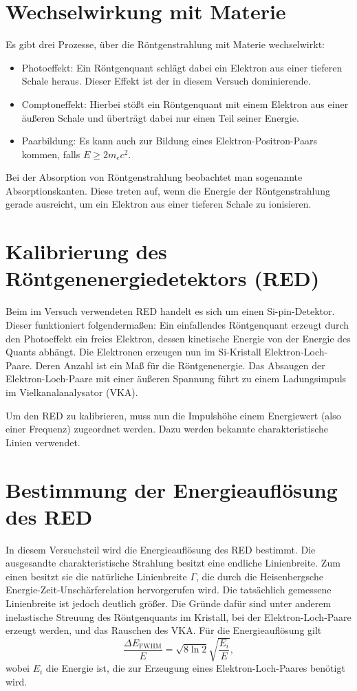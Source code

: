 \section{Wechselwirkung mit Materie}

Es gibt drei Prozesse, über die Röntgenstrahlung mit Materie wechselwirkt: \cite{Dem16}
\begin{itemize}
 \item Photoeffekt: Ein Röntgenquant schlägt dabei ein Elektron aus einer tieferen Schale heraus. Dieser Effekt ist der in diesem Versuch dominierende.
 \item Comptoneffekt: Hierbei stößt ein Röntgenquant mit einem Elektron aus einer äußeren Schale und überträgt dabei nur einen Teil seiner Energie.
 \item Paarbildung: Es kann auch zur Bildung eines Elektron-Positron-Paars kommen, falls $E\geq 2m_{e}c^{2}$.
\end{itemize}
Bei der Absorption von Röntgenstrahlung beobachtet man sogenannte Absorptionskanten. Diese treten auf, wenn die Energie der Röntgenstrahlung gerade ausreicht, um ein Elektron aus einer tieferen Schale zu ionisieren.

\section{Kalibrierung des Röntgenenergiedetektors (RED)}

Beim im Versuch verwendeten RED handelt es sich um einen Si-pin-Detektor. Dieser funktioniert folgendermaßen: Ein einfallendes Röntgenquant erzeugt durch den Photoeffekt ein freies Elektron, dessen kinetische Energie von der Energie des Quants abhängt.
Die Elektronen erzeugen nun im Si-Kristall Elektron-Loch-Paare. Deren Anzahl ist ein Maß für die Röntgenenergie. Das Absaugen der Elektron-Loch-Paare mit einer äußeren Spannung führt zu einem Ladungsimpuls im Vielkanalanalysator (VKA).

Um den RED zu kalibrieren, muss nun die Impulshöhe einem Energiewert (also einer Frequenz) zugeordnet werden. Dazu werden bekannte charakteristische Linien verwendet.

\section{Bestimmung der Energieauflösung des RED}

In diesem Versuchsteil wird die Energieauflösung des RED bestimmt. Die ausgesandte charakteristische Strahlung besitzt eine endliche Linienbreite. Zum einen besitzt sie die natürliche Linienbreite $\Gamma$, die durch die Heisenbergsche Energie-Zeit-Unschärferelation hervorgerufen wird.
Die tatsächlich gemessene Linienbreite ist jedoch deutlich größer. Die Gründe dafür sind unter anderem inelastische Streuung des Röntgenquants im Kristall, bei der Elektron-Loch-Paare erzeugt werden, und das Rauschen des VKA.
Für die Energieauflösung gilt \cite{litmap}
\begin{equation}
 \frac{\Delta E_{\textrm{FWHM}}}{E} = \sqrt{8\ln2}\sqrt{\frac{E_{i}}{E}},
\end{equation}
wobei $E_{i}$ die Energie ist, die zur Erzeugung eines Elektron-Loch-Paares benötigt wird.

